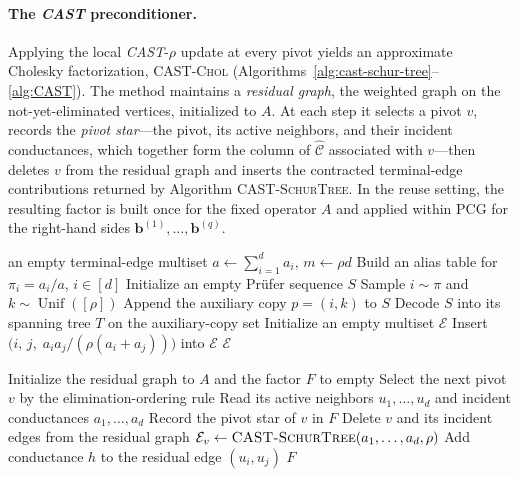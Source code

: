 \documentclass{article}
\newcommand{\CAST}{\textit{CAST}\xspace}
\newcommand{\calO}{\mathcal{O}}
\newcommand{\bigO}{\calO}
\newcommand{\1}{\mathbbm{1}}
\theoremstyle{plain}
\begin{document}
\paragraph{The \CAST{} pre\-conditioner.}
Applying the local \CAST-$\rho$ update at every pivot yields an
approximate Cholesky factorization, \textsc{CAST-Chol}
(Algorithms~\ref{alg:cast-schur-tree}--\ref{alg:CAST}). The method
maintains a \emph{residual graph}, the weighted graph on the
not-yet-eliminated vertices, initialized to $A$. At each step it
selects a pivot $v$, records the \emph{pivot star}---the pivot, its
active neighbors, and their incident conductances, which together form
the column of $\widehat{\mathcal{C}}$ associated with $v$---then
deletes $v$ from the residual graph and inserts the contracted
terminal-edge contributions returned by Algorithm \textsc{CAST-SchurTree}. In
the reuse setting, the resulting factor is built once for the fixed
operator $A$ and applied within PCG for the right-hand sides
$\mathbf{b}^{(1)},\ldots,\mathbf{b}^{(q)}$.

\begin{algorithm}[t]
\caption{\textsc{CAST-SchurTree}$(a_1,\ldots,a_d,\rho)$}
\label{alg:cast-schur-tree}
\begin{algorithmic}[1]
  \State \Return an empty terminal-edge multiset
\EndIf
\State $a\gets\sum_{i=1}^{d}a_i$, \quad $m\gets\rho d$
\State Build an alias table for $\pi_i=a_i/a$, $i\in[d]$
  \Comment{$\bigO(d)$}
\State Initialize an empty Pr\"ufer sequence $S$
  \State Sample $i\sim\pi$ and $k\sim\operatorname{Unif}([\rho])$
  \State Append the auxiliary copy $p=(i,k)$ to $S$
\EndFor
\State Decode $S$ into its spanning tree $T$ on the auxiliary-copy
  set \Comment{$\bigO(m)$}
\State Initialize an empty multiset $\mathcal{E}$
  \State Insert $\bigl(i,\,j,\;a_ia_j/(\rho(a_i+a_j))\bigr)$
    into $\mathcal{E}$
\EndFor
\State \Return $\mathcal{E}$
\end{algorithmic}
\end{algorithm}

\begin{algorithm}[t]
\caption{\textsc{CAST-Chol}$(A,\rho)$}
\label{alg:CAST}
\begin{algorithmic}[1]
\State Initialize the residual graph to $A$ and the factor $F$ to
  empty
  \State Select the next pivot $v$ by the elimination-ordering rule
  \State Read its active neighbors $u_1,\ldots,u_d$ and incident
    conductances $a_1,\ldots,a_d$
  \State Record the pivot star of $v$ in $F$
  \State Delete $v$ and its incident edges from the residual graph
  \State $\mathcal{E}_v\gets
    \textsc{CAST-SchurTree}(a_1,\ldots,a_d,\rho)$
    \State Add conductance $h$ to the residual edge $(u_i,u_j)$
  \EndFor
\EndWhile
\State \Return $F$
\end{algorithmic}
\end{algorithm}
\end{document}
